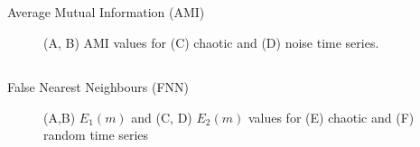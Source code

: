 \subsection{}
{

\begin{frame}{Average Mutual Information (AMI)}
    \begin{figure}
        \centering
	\caption{(A, B) AMI values for (C) chaotic and (D) noise time series.} 
   \end{figure}
	
\end{frame}
}


\subsection{}
{

\begin{frame}{False Nearest Neighbours (FNN)}
    \begin{figure}
        \centering
	\caption{(A,B) $E_1(m)$ and (C, D) $E_2(m)$ values for (E) chaotic 
		and (F) random time series} 
   \end{figure}
	
\end{frame}
}


